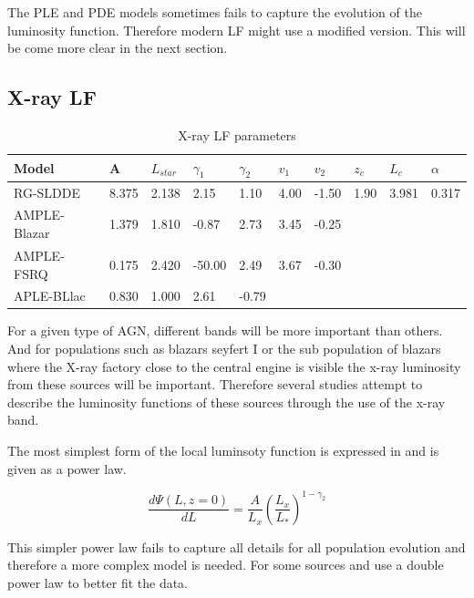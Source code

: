 \documentclass{article}
\begin{document}
The PLE and PDE models sometimes fails to capture the evolution of the luminosity function. Therefore modern 
LF might use a modified version. This will be come more clear in the next section.

\subsection{X-ray LF}

\begin{table}
\centering
\begin{tabularx}{\textwidth}{|l|X|X|X|X|X|X|X|X|X|}
\hline
Model & A & $L_{star}$ & $\gamma _1$ &  $\gamma _2$  & $v_1$ & $v_2$ & $z_c$ & $L_c$ & $ \alpha$\\
\hline
RG-SLDDE & 8.375 & 2.138 & 2.15 & 1.10 & 4.00 & -1.50 & 1.90 & 3.981 & 0.317  \\
\hline
AMPLE-Blazar & 1.379 & 1.810 & -0.87 & 2.73 & 3.45 & -0.25 & & &  \\
\hline
AMPLE-FSRQ & 0.175 & 2.420& -50.00 & 2.49 & 3.67 & -0.30 & & &  \\
\hline
APLE-BLlac & 0.830& 1.000 & 2.61 & -0.79 & & & & &  \\
\hline
\end{tabularx}
\caption{X-ray LF parameters}
\end{table}



For a given type of AGN, different bands will be more important than others. And for populations such as blazars seyfert I or the sub population of blazars where the 
X-ray factory close to the central engine is visible the x-ray luminosity from these sources will be important. 
Therefore several studies attempt to describe the luminosity functions of these sources through the use of the x-ray band. 

The most simplest form of the local luminsoty function is expressed in \cite{Ajello_2009} and is given as a power law.

\begin{equation}
    \frac{d\Psi(L,z=0)}{dL} = \frac{A}{L_x} \left( \frac{L_x}{L_*}\right)^{1-\gamma_2}
\end{equation}

This simpler power law fails to capture all details for all population evolution and
therefore a more complex model is needed. For some sources \cite{Ajello_2009} and  \cite{Ueda_2003} 
use a double power law to better fit the data.
   
\end{document}
